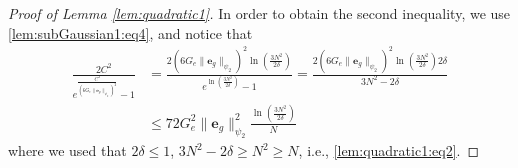 \documentclass{article}
\newcommand{\e}{\mathbf{e}}
\begin{document}
\begin{proof}[Proof of Lemma \ref{lem:quadratic1}]
    In order to obtain the second inequality, we use 
    \eqref{lem:subGaussian1:eq4},
    and notice that 
    \begin{align*}
        \frac{2C^2}{e^{\frac{C^2}{(6G_e \|\e_g\|_{\psi_2})^2}}-1} &=
          \frac{2(6G_e \|\e_g\|_{\psi_2})^2\ln(\frac{3N^2}{2\delta})}
          {e^{\ln(\frac{3N^2}{2\delta})}-1} = 
         \frac{2 (6G_e\|\e_g\|_{\psi_2})^2\ln(\frac{3N^2}{2\delta}) 2\delta}{3N^2-2\delta}\\
         &\le 72 G_e^2\|\e_g\|_{\psi_2}^2\frac{\ln(\frac{3N^2}{2\delta})}{N}
    \end{align*}
  where we used that $2\delta \le 1$, $3N^2-2\delta \ge N^2 \ge N$, i.e.,
  \eqref{lem:quadratic1:eq2}.
\end{proof}
\end{document}
